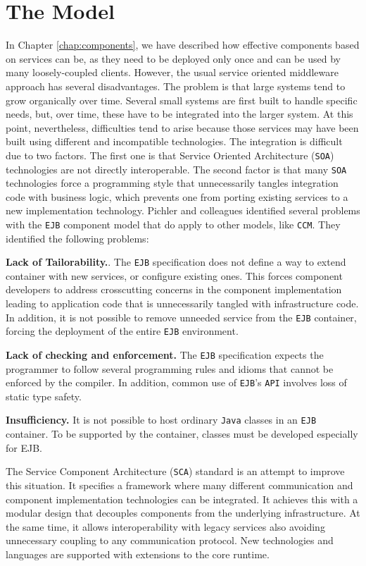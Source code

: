 \section{The Model}
In Chapter \ref{chap:components}, we have described how effective components based on services can be, as they need to be deployed only
once and can be used by many loosely-coupled clients. However, the usual service oriented middleware approach has several disadvantages.
The problem is that large systems tend to grow organically over time. Several small systems are first built to handle specific needs,
but, over time, these have to be integrated into the larger system. At this point, nevertheless, difficulties tend to arise because
those services may have been built using different and incompatible technologies. The integration is difficult due to two
factors. The first one is that Service Oriented Architecture (\texttt{SOA}) technologies are not directly interoperable. The second factor is that many \texttt{SOA} technologies
force a programming style that unnecessarily tangles integration code with business logic, which prevents one from porting
existing services to a new implementation technology. Pichler and colleagues \cite{Pichler} identified several problems with the \texttt{EJB}
component model that do apply to other models, like \texttt{CCM}. They identified the following problems:

\textbf{Lack of Tailorability.}. The \texttt{EJB} specification does not define a way to extend container with new services, or configure
existing ones. This forces component developers to address crosscutting concerns in the component implementation leading to application
code that is unnecessarily tangled with infrastructure code. In addition, it is not possible to remove unneeded service from
the \texttt{EJB} container, forcing the deployment of the entire \texttt{EJB} environment. 

\textbf{Lack of checking and enforcement.} The \texttt{EJB}
specification expects the programmer to follow several programming rules and idioms that cannot be enforced by the compiler.
In addition, common use of \texttt{EJB}'s \texttt{API} involves loss of static type safety. 

\textbf{Insufficiency.} It is not possible to host
ordinary \texttt{Java} classes in an \texttt{EJB} container. To be supported by the container, classes must be developed especially for EJB.

The Service Component Architecture (\texttt{SCA}) standard is an attempt to improve this situation. It specifies a framework
where many different communication and component implementation technologies can be integrated. It achieves this
with a modular design that decouples components from the underlying infrastructure. At the same time, it allows
interoperability with legacy services also avoiding unnecessary coupling to any communication protocol. New
technologies and languages are supported with extensions to the core runtime.

